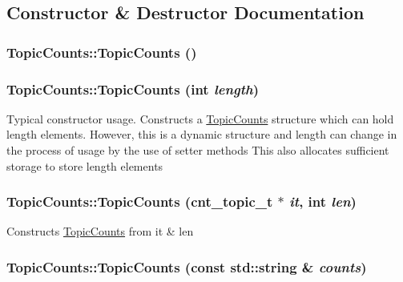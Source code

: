 \subsection{Constructor \& Destructor Documentation}
\hypertarget{struct_topic_counts_a8610e13cc9d52222d4c34c1914f70640}{
\subsubsection[{TopicCounts}]{\setlength{\rightskip}{0pt plus 5cm}TopicCounts::TopicCounts ()}}
\label{struct_topic_counts_a8610e13cc9d52222d4c34c1914f70640}
\hypertarget{struct_topic_counts_a58673c799b8bd91f357d5492df78e9cf}{
\subsubsection[{TopicCounts}]{\setlength{\rightskip}{0pt plus 5cm}TopicCounts::TopicCounts (int {\em length})}}
\label{struct_topic_counts_a58673c799b8bd91f357d5492df78e9cf}
Typical constructor usage. Constructs a \hyperlink{struct_topic_counts}{TopicCounts} structure which can hold length elements. However, this is a dynamic structure and length can change in the process of usage by the use of setter methods This also allocates sufficient storage to store length elements \hypertarget{struct_topic_counts_a045ad6ded5a1b6bcf608c2aa65370622}{
\subsubsection[{TopicCounts}]{\setlength{\rightskip}{0pt plus 5cm}TopicCounts::TopicCounts (cnt\_\-topic\_\-t $\ast$ {\em it}, \/  int {\em len})}}
\label{struct_topic_counts_a045ad6ded5a1b6bcf608c2aa65370622}
Constructs \hyperlink{struct_topic_counts}{TopicCounts} from it \& len \hypertarget{struct_topic_counts_a999dc787d880d568be9f5c8475fea998}{
\subsubsection[{TopicCounts}]{\setlength{\rightskip}{0pt plus 5cm}TopicCounts::TopicCounts (const std::string \& {\em counts})}}
